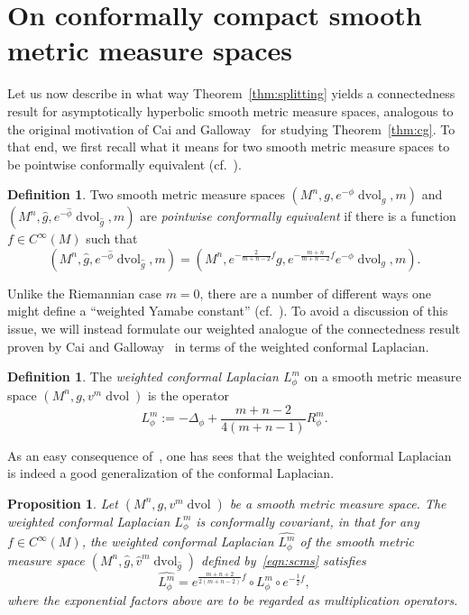 \documentclass{amsart}
\newtheorem{prop}[thm]{Proposition}
\theoremstyle{definition}
\newtheorem{defn}[thm]{Definition}
\theoremstyle{remark}
\numberwithin{equation}{section}
\begin{document}
\section{On conformally compact smooth metric measure spaces}
\label{sec:ah}

Let us now describe in what way Theorem~\ref{thm:splitting} yields a connectedness result for asymptotically hyperbolic smooth metric measure spaces, analogous to the original motivation of Cai and Galloway~\cite{CaiGalloway1999} for studying Theorem~\ref{thm:cg}.  To that end, we first recall what it means for two smooth metric measure spaces to be pointwise conformally equivalent (cf.\ \cite{Case2010a}).

\begin{defn}
\label{defn:scms}
Two smooth metric measure spaces $(M^n,g,e^{-\phi}\operatorname{dvol}_g,m)$ and $(M^n,\hat g,e^{-\hat\phi}\operatorname{dvol}_{\hat g},m)$ are \emph{pointwise conformally equivalent} if there is a function $f\in C^\infty(M)$ such that
\begin{equation}
\label{eqn:scms}
\left( M^n, \hat g, e^{-\hat\phi}\operatorname{dvol}_{\hat g},m \right) = \left( M^n, e^{-\frac{2}{m+n-2}f}g, e^{-\frac{m+n}{m+n-2}f}e^{-\phi}\operatorname{dvol}_g, m \right) .
\end{equation}
\end{defn}

Unlike the Riemannian case $m=0$, there are a number of different ways one might define a ``weighted Yamabe constant'' (cf.\ \cite{Case2011gns}).  To avoid a discussion of this issue, we will instead formulate our weighted analogue of the connectedness result proven by Cai and Galloway~\cite{CaiGalloway1999} in terms of the weighted conformal Laplacian.

\begin{defn}
\label{defn:weighted_conformal_laplacian}
The \emph{weighted conformal Laplacian $L_\phi^m$} on a smooth metric measure space $(M^n,g,v^m\operatorname{dvol})$ is the operator
\[ L_\phi^m := -\Delta_\phi + \frac{m+n-2}{4(m+n-1)}R_\phi^m . \]
\end{defn}

As an easy consequence of~\cite[Proposition~4.4]{Case2010a}, one has sees that the weighted conformal Laplacian is indeed a good generalization of the conformal Laplacian.

\begin{prop}
\label{prop:wcl_conformally_covariant}
Let $(M^n,g,v^m\operatorname{dvol})$ be a smooth metric measure space.  The weighted conformal Laplacian $L_\phi^m$ is conformally covariant, in that for any $f\in C^\infty(M)$, the weighted conformal Laplacian $\widehat{L_\phi^m}$ of the smooth metric measure space $(M^n,\hat g,\hat v^m\operatorname{dvol}_{\hat g})$ defined by~\eqref{eqn:scms} satisfies
\[ \widehat{L_\phi^m} = e^{\frac{m+n+2}{2(m+n-2)}f} \circ L_\phi^m \circ e^{-\frac{1}{2}f} , \]
where the exponential factors above are to be regarded as multiplication operators.
\end{prop}
\end{document}
